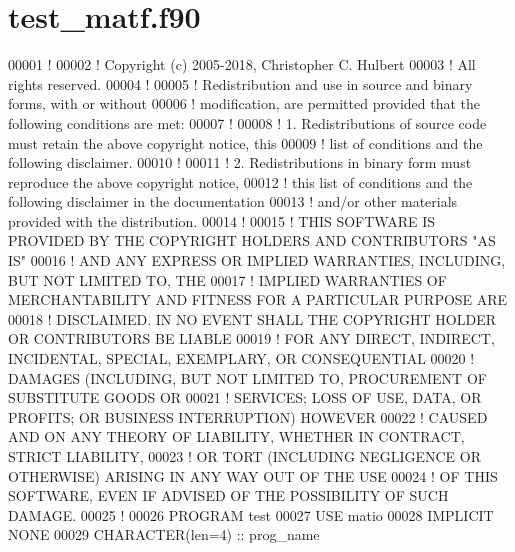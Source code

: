 \hypertarget{test__matf_8f90_source}{}\section{test\+\_\+matf.\+f90}
\label{test__matf_8f90_source}

\begin{DoxyCode}
00001 \textcolor{comment}{!}
00002 \textcolor{comment}{! Copyright (c) 2005-2018, Christopher C. Hulbert}
00003 \textcolor{comment}{! All rights reserved.}
00004 \textcolor{comment}{!}
00005 \textcolor{comment}{! Redistribution and use in source and binary forms, with or without}
00006 \textcolor{comment}{! modification, are permitted provided that the following conditions are met:}
00007 \textcolor{comment}{!}
00008 \textcolor{comment}{! 1. Redistributions of source code must retain the above copyright notice, this}
00009 \textcolor{comment}{!    list of conditions and the following disclaimer.}
00010 \textcolor{comment}{!}
00011 \textcolor{comment}{! 2. Redistributions in binary form must reproduce the above copyright notice,}
00012 \textcolor{comment}{!    this list of conditions and the following disclaimer in the documentation}
00013 \textcolor{comment}{!    and/or other materials provided with the distribution.}
00014 \textcolor{comment}{!}
00015 \textcolor{comment}{! THIS SOFTWARE IS PROVIDED BY THE COPYRIGHT HOLDERS AND CONTRIBUTORS "AS IS"}
00016 \textcolor{comment}{! AND ANY EXPRESS OR IMPLIED WARRANTIES, INCLUDING, BUT NOT LIMITED TO, THE}
00017 \textcolor{comment}{! IMPLIED WARRANTIES OF MERCHANTABILITY AND FITNESS FOR A PARTICULAR PURPOSE ARE}
00018 \textcolor{comment}{! DISCLAIMED. IN NO EVENT SHALL THE COPYRIGHT HOLDER OR CONTRIBUTORS BE LIABLE}
00019 \textcolor{comment}{! FOR ANY DIRECT, INDIRECT, INCIDENTAL, SPECIAL, EXEMPLARY, OR CONSEQUENTIAL}
00020 \textcolor{comment}{! DAMAGES (INCLUDING, BUT NOT LIMITED TO, PROCUREMENT OF SUBSTITUTE GOODS OR}
00021 \textcolor{comment}{! SERVICES; LOSS OF USE, DATA, OR PROFITS; OR BUSINESS INTERRUPTION) HOWEVER}
00022 \textcolor{comment}{! CAUSED AND ON ANY THEORY OF LIABILITY, WHETHER IN CONTRACT, STRICT LIABILITY,}
00023 \textcolor{comment}{! OR TORT (INCLUDING NEGLIGENCE OR OTHERWISE) ARISING IN ANY WAY OUT OF THE USE}
00024 \textcolor{comment}{! OF THIS SOFTWARE, EVEN IF ADVISED OF THE POSSIBILITY OF SUCH DAMAGE.}
00025 \textcolor{comment}{!}
00026 \textcolor{keyword}{PROGRAM} test
00027 \textcolor{keywordtype}{USE }matio
00028 \textcolor{keywordtype}{IMPLICIT NONE}
00029     \textcolor{keywordtype}{CHARACTER(len=4)}                :: prog\_name

\end{DoxyCode}
